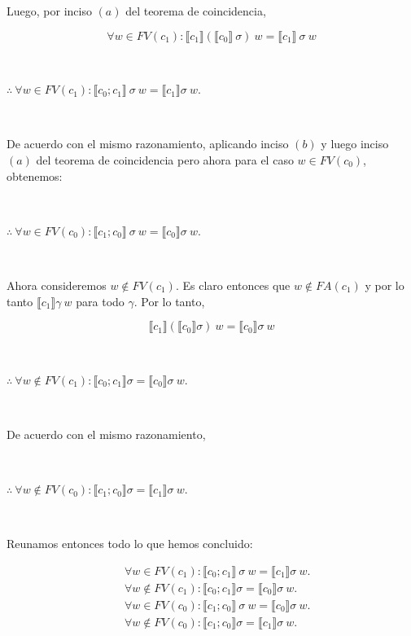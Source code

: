 \documentclass[a4paper, 12pt]{article}
\begin{document}
Luego, por inciso $(a)$ del teorema de coincidencia,

\begin{equation*}
  \forall  w \in FV(c_1) : \llbracket c_1 \rrbracket\left( \llbracket c_0 \rrbracket ~ \sigma\right)   ~ w
  = \llbracket c_1 \rrbracket ~ \sigma ~ w
\end{equation*}

~

$\therefore ~ \forall w \in FV(c_1) : \llbracket c_0;c_1 \rrbracket ~ \sigma ~  w =
\llbracket c_1 \rrbracket \sigma ~ w$.

~

De acuerdo con el mismo razonamiento, aplicando inciso $(b)$ y luego inciso
$(a)$ del teorema de coincidencia pero ahora para el caso $w \in FV(c_0)$,
obtenemos:

~

$\therefore  ~ \forall  w \in FV(c_0) : \llbracket c_1;c_0 \rrbracket ~ \sigma ~
w = \llbracket c_0 \rrbracket\sigma ~ w$.

~

Ahora consideremos $w \not\in FV(c_1)$. Es claro entonces que $w \not\in
FA(c_1)$ y por lo tanto $\llbracket c_1 \rrbracket \gamma ~ w$ para todo
$\gamma$. Por lo tanto, 

\begin{equation*}
  \llbracket c_1 \rrbracket \left( \llbracket c_0 \rrbracket\sigma \right) ~ w =
  \llbracket c_0 \rrbracket\sigma ~ w
\end{equation*}

~

$\therefore ~ \forall  w \not\in FV(c_1) : \llbracket c_0;c_1 \rrbracket\sigma =
\llbracket c_0 \rrbracket\sigma ~ w$.


~

De acuerdo con el mismo razonamiento,

~
~

$\therefore ~ \forall  w \not\in FV(c_0) : \llbracket c_1;c_0 \rrbracket\sigma =
\llbracket c_1 \rrbracket\sigma ~ w$.

~

Reunamos entonces todo lo que hemos concluido:

\begin{align*}
 &~ \forall w \in FV(c_1) : \llbracket c_0;c_1 \rrbracket ~ \sigma ~  w =
\llbracket c_1 \rrbracket \sigma ~ w.\\
 &~ \forall  w \not\in FV(c_1) : \llbracket c_0;c_1 \rrbracket\sigma =
\llbracket c_0 \rrbracket\sigma ~ w.\\
 & ~ \forall  w \in FV(c_0) : \llbracket c_1;c_0 \rrbracket ~ \sigma ~
w = \llbracket c_0 \rrbracket\sigma ~ w.\\
 &~ \forall  w \not\in FV(c_0) : \llbracket c_1;c_0 \rrbracket\sigma =
\llbracket c_1 \rrbracket\sigma ~ w.
\end{align*}
~
\end{document}
